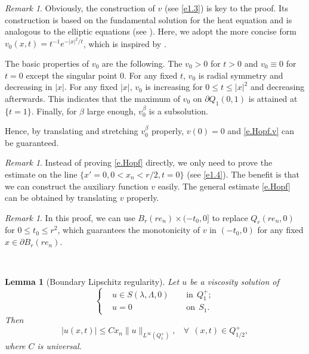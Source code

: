 \documentclass[preprint,12pt]{elsarticle}
\newtheorem{lemma}[theorem]{Lemma}
\theoremstyle{definition}
\theoremstyle{remark}
\newtheorem{remark}[theorem]{Remark}
\numberwithin{equation}{section}
\begin{document}
\begin{remark}\label{Hopf1}
Obviously, the construction of $v$ (see \cref{e1.3}) is key to the proof. Its construction is based on the fundamental solution for the heat equation and is analogous to the elliptic equations (see \cite{MR_Israel}). Here, we adopt the more concise form $v_0(x,t)=t^{-1}e^{-|x|^2/t}$, which is inspired by \cite[$\Gamma^N$ in P. 154]{MR1139064}.

The basic properties of $v_0$ are the following. The $v_0 > 0$ for $t>0$ and $v_0\equiv 0$ for $t=0$ except the singular point $0$. For any fixed $t$, $v_0$ is radial symmetry and decreasing in $|x|$. For any fixed $|x|$, $v_0$ is increasing for $0\leq t\leq |x|^2$ and decreasing afterwards. This indicates that the maximum of $v_0$ on $\partial Q_1(0,1)$ is attained at $\{t=1\}$. Finally, for $\beta$ large enough, $v_0^{\beta}$ is a subsolution.

Hence, by translating and stretching $v_0^{\beta}$ properly, $v(0)=0$ and \cref{e.Hopf.v} can be guaranteed.
\end{remark}

\begin{remark}\label{Hopf2}
Instead of proving \cref{e.Hopf} directly, we only need to prove the estimate on the line $\{x'=0,0< x_n< r/2,t=0\}$ (see \cref{e1.4}). The benefit is that we can construct the auxiliary function $v$ easily. The general estimate \cref{e.Hopf} can be obtained by translating $v$ properly.
\end{remark}

\begin{remark}\label{Hopf3}
In this proof, we can use $B_r(re_n)\times (-t_0,0]$ to replace $Q_r(re_n,0)$ for $0\leq t_0\leq r^2$, which guarantees the monotonicity of $v$ in $(-t_0,0)$ for any fixed $x\in \partial B_r(re_n)$.
\end{remark}
~\\

\begin{lemma}[Boundary Lipschitz regularity]\label{L4}
  Let $u$ be a viscosity solution of
  \begin{equation}\label{e.S0}
\left\{\begin{aligned}
&u\in S(\lambda,\Lambda,0)&& ~~\mbox{in}~~Q_1^+;\\
&u=0&& ~~\mbox{on}~~S_1.
\end{aligned}\right.
\end{equation}
Then
\begin{equation}\label{e.Lipschitz}
|u(x,t)|\leq Cx_n\|u\|_{L^{\infty}(Q_1^+)},~~~~\forall ~~(x,t) \in Q_{1/2}^+,
\end{equation}
where $C$ is universal.
\end{lemma}
\end{document}
